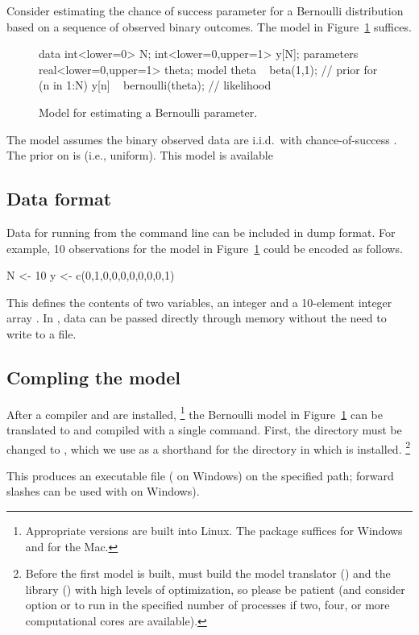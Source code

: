 \documentclass[article]{jss}
\begin{document}
Consider estimating the chance of success parameter for a Bernoulli
distribution based on a sequence of observed binary outcomes.  The
 model in Figure~\ref{bernoulli-model.fig} suffices.
%
\begin{figure}
\begin{Code}
data { 
  int<lower=0> N; 
  int<lower=0,upper=1> y[N];
} 
parameters {
  real<lower=0,upper=1> theta;
} 
model {
  theta ~ beta(1,1);  // prior
  for (n in 1:N) 
    y[n] ~ bernoulli(theta);  // likelihood
}
\end{Code}
\caption{Model for estimating a Bernoulli parameter.}\label{bernoulli-model.fig}
\end{figure}
%
The model assumes the binary observed data  are
i.i.d.\ with chance-of-success .  The prior on
 is  (i.e., uniform).  This model is available


\subsection{Data format}

Data for running  from the command line can be included
in  dump format.  For example, 10 observations for the
model in Figure~\ref{bernoulli-model.fig} could be encoded as follows.
%
\begin{Code}
N <- 10
y <- c(0,1,0,0,0,0,0,0,0,1)
\end{Code}
%
This defines the contents of two variables, an integer  and a
10-element integer array .  In , data can be passed
directly through memory without the need to write to a file.

\subsection{Compling the model}

After a  compiler and  are installed,%
%
\footnote{Appropriate versions are built into Linux. The 
  package suffices for Windows and  for the Mac.}
%
the Bernoulli model in Figure~\ref{bernoulli-model.fig} can be
translated to  and compiled with a single command.
First, the directory must be changed to , which we use as
a shorthand for the directory in which  is installed.%
%
\footnote{Before the first model is built,  must build the
  model translator () and the  library
  () with high levels of optimization, so please
  be patient (and consider  option  or 
  to run in the specified number of processes if two, four, or more
  computational cores are available).}
%
\begin{CodeChunk}
\end{CodeChunk}
%
This produces an executable file 
( on Windows) on the specified path; forward
slashes can be used with  on Windows).
\end{document}
